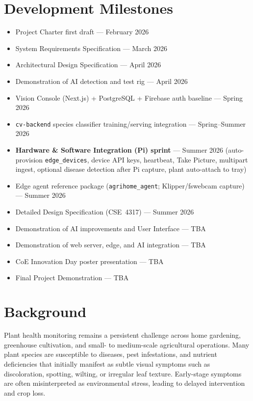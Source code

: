 \documentclass[11pt,letterpaper]{article}
\begin{document}
\section{Development Milestones}
\begin{itemize}
  \item Project Charter first draft --- February 2026
  \item System Requirements Specification --- March 2026
  \item Architectural Design Specification --- April 2026
  \item Demonstration of AI detection and test rig --- April 2026
  \item Vision Console (Next.js) + PostgreSQL + Firebase auth baseline --- Spring 2026
  \item \texttt{cv-backend} species classifier training/serving integration --- Spring--Summer 2026
  \item \textbf{Hardware \& Software Integration (Pi) sprint} --- Summer 2026
        (auto-provision \texttt{edge\_devices}, device API keys, heartbeat, Take Picture, multipart
        ingest, optional disease detection after Pi capture, plant auto-attach to tray)
  \item Edge agent reference package (\texttt{agrihome\_agent}; Klipper/fswebcam capture) --- Summer 2026
  \item Detailed Design Specification (CSE~4317) --- Summer 2026
  \item Demonstration of AI improvements and User Interface --- TBA
  \item Demonstration of web server, edge, and AI integration --- TBA
  \item CoE Innovation Day poster presentation --- TBA
  \item Final Project Demonstration --- TBA
\end{itemize}

\section{Background}
Plant health monitoring remains a persistent challenge across home gardening, greenhouse cultivation,
and small- to medium-scale agricultural operations. Many plant species are susceptible to diseases,
pest infestations, and nutrient deficiencies that initially manifest as subtle visual symptoms such as
discoloration, spotting, wilting, or irregular leaf texture. Early-stage symptoms are often
misinterpreted as environmental stress, leading to delayed intervention and crop loss.
\end{document}

